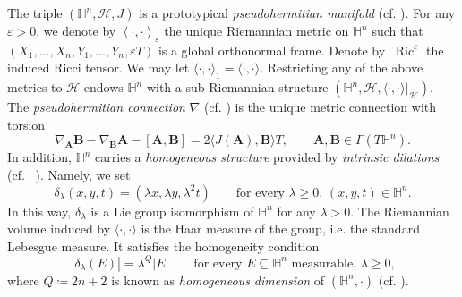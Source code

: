 \documentclass[11pt]{amsart}
\renewcommand{\geq}{\geqslant}
\newcommand{\hhh}{{\mathcal{H}}}
\newcommand{\hn}{\mathbb{H}^n}
\newcommand{\hh}{{\mathbb{H}}}
\newcommand{\eps}{\varepsilon}
\newcommand{\A}{\mathbf{A}}
\newcommand{\B}{\mathbf{B}}
\DeclareMathOperator{\ric}{Ric}
\DeclareMathOperator{\divv}{div}
\theoremstyle{definition}
\theoremstyle{remark}
\numberwithin{equation}{section}
\begin{document}
 The triple $(\hh^n,\hhh,J)$ is a prototypical \emph{pseudohermitian manifold} (cf. \cite[Appendix]{MR2165405}). 
For any $\eps>0$, we denote by $\left\langle\cdot,\cdot\right\rangle_\eps$ the unique Riemannian metric on $\hh^n$ such that $(X_1,\ldots,X_n,Y_1,\ldots,Y_n,\eps T)$ is a global orthonormal frame.  Denote by $\ \ric^\eps $ the induced Ricci tensor. We may let $\langle\cdot,\cdot\rangle_1=\langle\cdot,\cdot\rangle$. Restricting any of the above metrics to $\hhh$ endows $\hn$ with a sub-Riemannian structure $\left(\hh^n,\hhh,\langle\cdot,\cdot\rangle|_\hhh\right)$. 
 The \emph{pseudohermitian connection} $\nabla$ (cf. \cite{MR4193432}) is the unique metric connection with torsion 
\begin{equation*}\label{pseudotorsion}
        \nabla_\A\B-\nabla_\B \A-[\A,\B]=2\langle J(\A),\B\rangle T,\qquad \A,\B\in\Gamma(T\hh^n).
\end{equation*}
In addition, $\hh^n$ carries a \emph{homogeneous structure} provided by \emph{intrinsic dilations} (cf. ~\cite{MR2363343}). 
Namely, we set 
\begin{equation*}
\delta_\lambda(x,y,t) = (\lambda x,\lambda y,\lambda^2 t) \qquad \text{for every $\lambda \geq 0$, $(x,y,t) \in\hh^n$}.
\end{equation*}
In this way, $\delta_\lambda$ is a Lie group isomorphism of $\hh^n$ for any $\lambda>0$. The Riemannian volume induced by $\langle\cdot,\cdot\rangle$ is the Haar measure of the group, i.e. the standard Lebesgue measure.
It satisfies the homogeneity condition
\begin{equation*} \label{eq_dilation_Lebesgue}
|\delta_\lambda(E)|=\lambda^Q|E| \qquad \text{for every $E \subseteq\hh^n$ measurable, $\lambda \geq 0$,}
\end{equation*}
where $Q\coloneqq 2n+2$ is known as \emph{homogeneous dimension} of $(\hh^n,\cdot)$ (cf. \cite{MR3587666}). 
\end{document}
